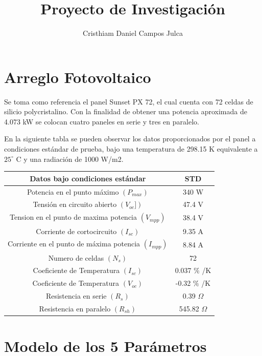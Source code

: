 \documentclass[a4paper,12pt]{article}
\title{Proyecto de Investigación}
\author{Cristhiam Daniel Campos Julca}
\begin{document}
 
	\maketitle 
	
	\section{Arreglo Fotovoltaico}
	
	Se  toma como referencia el panel Sunset PX 72, el cual cuenta con 72 celdas de silicio polycristalino. Con la finalidad de obtener una potencia aproximada de 4.073 kW se colocan cuatro paneles en serie y tres en paralelo. 
	
	En la siguiente tabla se pueden observar los datos proporcionados por el panel a condiciones estándar de prueba, bajo una temperatura de	298.15 K equivalente a $25^{\circ}$ C y una radiación de 1000 W/m2. \newline
	
	
	\begin{tabular}{| c | c |}
		\hline
		\textbf{Datos bajo condiciones estándar} & \textbf{STD} \\ \hline
		Potencia en el punto máximo $(P_{max})$  & 340 W \\ \hline
		Tensión en circuito abierto $(V_{oc}])$ & 47.4 V \\ \hline
		Tension en el punto de maxima potencia $(V_{mpp})$ & 38.4 V \\ \hline
		Corriente de cortocircuito $ (I_{sc})$ & 9.35 A \\ \hline
		Corriente en el punto de máxima potencia $(I_{mpp})$ & 8.84 A \\ \hline
		Numero de celdas $(N_s)$ & 72 \\ \hline
		Coeficiente de Temperatura $(I_{sc})$ & 0.037 $\%$ /K \\ \hline
		Coeficiente de Temperatura $(V_{oc})$ & -0.32 $\%$ /K \\ \hline
		Resistencia en serie $(R_s)$ & 0.39 $\Omega$\\ \hline
		Resistencia en paralelo $(R_{sh})$ & 545.82 $\Omega$ \\ \hline
	\end{tabular} 

	\newpage
	
	\section{Modelo de los 5 Parámetros}
	
\end{document}
